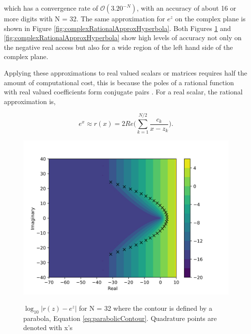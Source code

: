 \noindent which has a convergence rate of $\mathcal{O}(3.20^{-N} )$, with an accuracy of about 16 or more digits with N = 32. The same approximation for $e^{z}$ on the complex plane is shown in Figure \ref{fig:complexRationalApproxHyperbola}. Both Figures \ref{fig:complexRationalApproxParabola} and \ref{fig:complexRationalApproxHyperbola} show high levels of accuracy not only on the negative real access but also for a wide region of the left hand side of the complex plane. 

Applying these approximations to real valued scalars or matrices requires half the amount of computational cost, this is because the poles of a rational function with real valued coefficients form conjugate pairs \cite{pusa2011}. For a real scalar, the rational approximation is,

\begin{equation}
    e^{x} \approx r(x) = 2Re\bigg(\sum_{k=1}^{N/2}\frac{c_{k}}{x - z_{k}}\bigg).
\end{equation}


\begin{figure}[h]
  \centering
  \includegraphics[width=5in]{images/RationApproxParabolicError32.png}\\
  \caption{$\log_{10}|r(z)-e^{z}|$ for N = 32 where the contour is defined by a parabola, Equation \ref{eq:parabolicContour}. Quadrature points are denoted with x's}
  \label{fig:complexRationalApproxParabola}
\end{figure} 

